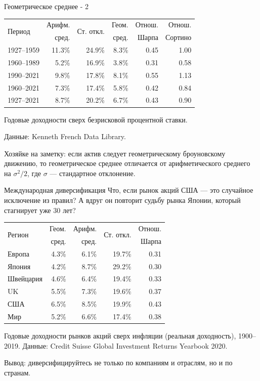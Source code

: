 \documentclass{beamer}
\begin{document}
\begin{frame}{Геометрическое среднее - 2}
\centering
\begin{tabular}{l|r|r|r|r|r}
\multirow{2}{*}{Период} &
Арифм. & 
\multirow{2}{*}{Ст. откл.} &
Геом. &
Отнош. &
Отнош. \\
& сред. & & сред. & Шарпа & Сортино \\ 
\hline
1927--1959 & 11.3\% & 24.9\% & 8.3\% & 0.45 & 1.00 \\
1960--1989 &  5.2\% & 16.9\% & 3.8\% & 0.31 & 0.58 \\
1990--2021 &  9.8\% & 17.8\% & 8.1\% & 0.55 & 1.13 \\
1960--2021 &  7.3\% & 17.4\% & 5.8\% & 0.42 & 0.84 \\ \hline
1927--2021 &  8.7\% & 20.2\% & 6.7\% & 0.43 & 0.90
\end{tabular}

{\scriptsize Годовые доходности сверх безрисковой процентной ставки.

Данные: Kenneth French Data Library. \par }

\justify
Хозяйке на заметку: если актив следует геометрическому броуновскому движению,
то геометрическое среднее отличается от арифметического среднего на $
\sigma^2/2$, где $\sigma$ --- стандартное отклонение.
\end{frame}


\begin{frame}{Международная диверсификация}
\justify
Что, если рынок акций США --- это случайное исключение из правил? А вдруг он 
повторит судьбу рынка Японии, который стагнирует уже 30 лет?

\centering
\begin{tabular}{l|r|r|r|r}
\multirow{2}{*}{Регион} &
Геом. & 
Арифм. &
\multirow{2}{*}{Ст. откл.} &
Отнош. \\
& сред. & сред. & & Шарпа \\ \hline
Европа    & 4.3\% & 6.1\% & 19.7\% & 0.31 \\
Япония    & 4.2\% & 8.7\% & 29.2\% & 0.30 \\
Швейцария & 4.6\% & 6.4\% & 19.4\% & 0.33 \\
UK        & 5.5\% & 7.3\% & 19.6\% & 0.37 \\
США       & 6.5\% & 8.5\% & 19.9\% & 0.43 \\ \hline
Мир       & 5.2\% & 6.6\% & 17.4\% & 0.38
\end{tabular}

\centering
{\scriptsize Годовые доходности рынков акций сверх инфляции (реальная доходность),
1900--2019. Данные: Credit Suisse Global Investment Returns Yearbook 2020.}

\justify
Вывод: диверсифицируйтесь не только по компаниям и отраслям, но и по странам.
\end{frame}
\end{document}
